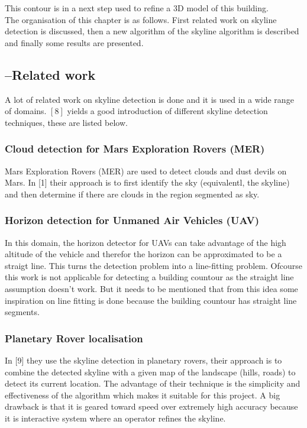 \documentclass[10pt]{article}
\begin{document}
This
contour is in a next step used to refine a 3D model of this building.\\
The organisation of this chapter is as follows.  First related work on skyline
detection is discussed, then a new algorithm of the skyline algorithm is
described and finally some results are presented.\\
 \subsection{--Related work}
A lot of related work on skyline detection is done and it is used in a wide
range of domains. $[8]$ yields a good introduction of different skyline
detection techniques, these are listed below.

\subsubsection{Cloud detection for Mars Exploration Rovers (MER)}
Mars Exploration Rovers (MER) are used to detect clouds and dust devils on Mars.
In [1] their approach is to first identify the sky (equivalentl, the skyline)
and then determine if there are clouds in the region segmented as sky.

\subsubsection{Horizon detection for Unmaned Air Vehicles (UAV)}
In this domain, the horizon detector for UAVs can take advantage of the high
altitude of the vehicle and therefor the horizon can be approximated to be a
straigt line.  This turns the detection problem into a line-fitting problem.
Ofcourse this work is not applicable for detecting a building countour as the
straight line assumption doesn't work. But it needs to be mentioned that from this
idea some inspiration on line fitting is done because the building countour has
straight line segments.

\subsubsection{Planetary Rover localisation}
In [9] they use the skyline detection in planetary rovers, their approach is to
combine the detected skyline with a given map of the landscape (hills, roads) to
detect its current location. 
The advantage of their technique is the simplicity and effectiveness of the
algorithm which makes it suitable for this project.  A big drawback is that it
is geared toward speed over extremely high accuracy because it is 
interactive system where an operator refines the skyline.
\end{document}
